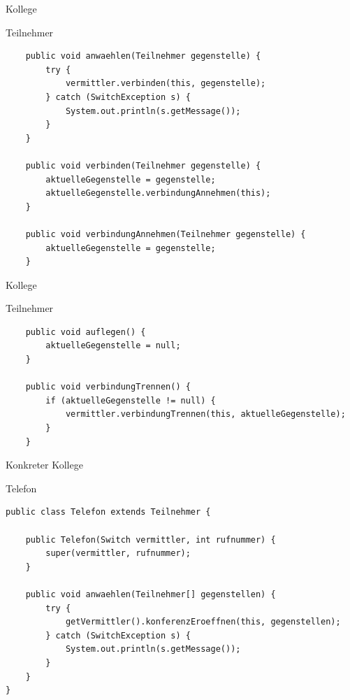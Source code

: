 \begin{frame}[fragile]{Kollege}
	\begin{exampleblock}{Teilnehmer}
 		\begin{lstlisting}
	public void anwaehlen(Teilnehmer gegenstelle) {
		try {
			vermittler.verbinden(this, gegenstelle);
		} catch (SwitchException s) {
			System.out.println(s.getMessage());
		}
	}
	
	public void verbinden(Teilnehmer gegenstelle) {
		aktuelleGegenstelle = gegenstelle;
		aktuelleGegenstelle.verbindungAnnehmen(this);
	}
	
	public void verbindungAnnehmen(Teilnehmer gegenstelle) {
		aktuelleGegenstelle = gegenstelle;
	}
        \end{lstlisting}
 	\end{exampleblock}
\end{frame}

\begin{frame}[fragile]{Kollege}
	\begin{exampleblock}{Teilnehmer}
 		\begin{lstlisting}
	public void auflegen() {
		aktuelleGegenstelle = null;
	}
	
	public void verbindungTrennen() {
		if (aktuelleGegenstelle != null) {
			vermittler.verbindungTrennen(this, aktuelleGegenstelle);
		}
	}
        \end{lstlisting}
 	\end{exampleblock}
\end{frame}

\begin{frame}[fragile]{Konkreter Kollege}
	\begin{exampleblock}{Telefon}
 		\begin{lstlisting}
public class Telefon extends Teilnehmer {

	public Telefon(Switch vermittler, int rufnummer) {
		super(vermittler, rufnummer);
	}
	
	public void anwaehlen(Teilnehmer[] gegenstellen) {
		try {
			getVermittler().konferenzEroeffnen(this, gegenstellen);
		} catch (SwitchException s) {
			System.out.println(s.getMessage());
		}
	}
}

        \end{lstlisting}
 	\end{exampleblock}
\end{frame}


